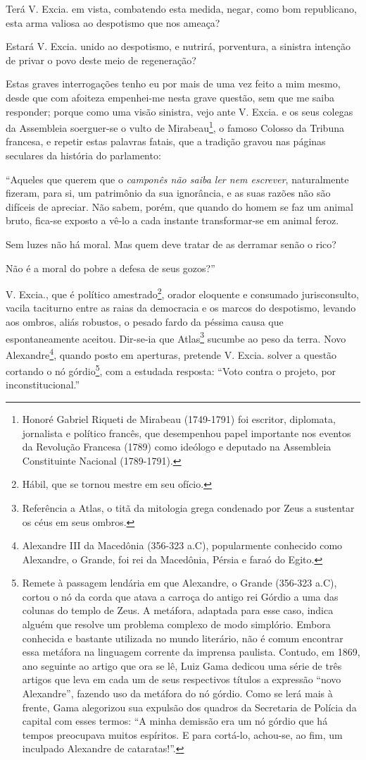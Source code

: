 Terá V. Excia. em vista, combatendo esta medida, negar, como bom
republicano, esta arma valiosa ao despotismo que nos ameaça?

Estará V. Excia. unido ao despotismo, e nutrirá, porventura, a sinistra
intenção de privar o povo deste meio de regeneração?

Estas graves interrogações tenho eu por mais de uma vez feito a mim
mesmo, desde que com afoiteza empenhei-me nesta grave questão, sem que
me saiba responder; porque como uma visão sinistra, vejo ante V. Excia.
e os seus colegas da Assembleia soerguer-se o vulto de
Mirabeau\footnote{Honoré Gabriel Riqueti de Mirabeau (1749-1791) foi
  escritor, diplomata, jornalista e político francês, que desempenhou
  papel importante nos eventos da Revolução Francesa (1789) como
  ideólogo e deputado na Assembleia Constituinte Nacional (1789-1791).},
o famoso Colosso da Tribuna francesa, e repetir estas palavras fatais,
que a tradição gravou nas páginas seculares da história do parlamento:

``Aqueles que querem que o \emph{camponês não saiba ler nem escrever},
naturalmente fizeram, para si, um patrimônio da sua ignorância, e as
suas razões não são difíceis de apreciar. Não sabem, porém, que quando
do homem se faz um animal bruto, fica-se exposto a vê-lo a cada instante
transformar-se em animal feroz.

Sem luzes não há moral. Mas quem deve tratar de as derramar senão o
rico?

Não é a moral do pobre a defesa de seus gozos?''

V. Excia., que é político amestrado\footnote{Hábil, que se tornou
  mestre em seu ofício.}, orador eloquente e consumado jurisconsulto,
vacila taciturno entre as raias da democracia e os marcos do despotismo,
levando aos ombros, aliás robustos, o pesado fardo da péssima causa que
espontaneamente aceitou. Dir-se-ia que Atlas\footnote{Referência a
  Atlas, o titã da mitologia grega condenado por Zeus a sustentar os
  céus em seus ombros.} sucumbe ao peso da terra. Novo
Alexandre\footnote{Alexandre III da Macedônia (356-323 a.C),
  popularmente conhecido como Alexandre, o Grande, foi rei da Macedônia,
  Pérsia e faraó do Egito.}, quando posto em aperturas, pretende V.
Excia. solver a questão cortando o nó górdio\footnote{Remete à
  passagem lendária em que Alexandre, o Grande (356-323 a.C), cortou o
  nó da corda que atava a carroça do antigo rei Górdio a uma das colunas
  do templo de Zeus. A metáfora, adaptada para esse caso, indica alguém
  que resolve um problema complexo de modo simplório. Embora conhecida e
  bastante utilizada no mundo literário, não é comum encontrar essa
  metáfora na linguagem corrente da imprensa paulista. Contudo, em 1869,
  ano seguinte ao artigo que ora se lê, Luiz Gama dedicou uma série de
  três artigos que leva em cada um de seus respectivos títulos a
  expressão ``novo Alexandre'', fazendo uso da metáfora do nó górdio. Como
  se lerá mais à frente, Gama alegorizou sua expulsão dos quadros da
  Secretaria de Polícia da capital com esses termos: ``A minha demissão
  era um nó górdio que há tempos preocupava muitos espíritos. E para
  cortá-lo, achou-se, ao fim, um inculpado Alexandre de cataratas!''.},
com a estudada resposta: ``Voto contra o projeto, por inconstitucional.''

